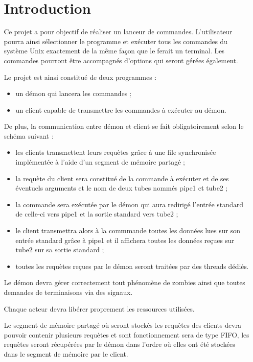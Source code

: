 \section*{Introduction} %

Ce projet a pour objectif de réaliser un lanceur de commandes.
L'utilisateur pourra ainsi sélectionner le programme et exécuter 
tous les commandes du système Unix exactement de la même façon 
que le ferait un terminal.
Les commandes pourront être accompagnés d'options qui seront gérées également.
\smallskip

Le projet est ainsi constitué de deux programmes :
\begin{itemize} %
\item un démon qui lancera les commandes ;
\item un client capable de transmettre les commandes à exécuter au démon.
\end{itemize}
\smallskip

De plus, la communication entre démon et client se fait 
obligatoirement selon le schéma suivant :
\begin{itemize}
 \item les clients transmettent leurs requètes 
       grâce à une file synchronisée implémentée 
       à l'aide d'un segment de mémoire partagé ;
 \item la requète du client sera constitué 
       de la commande à exécuter et de ses 
       éventuels arguments et le nom de deux 
       tubes nommés pipe1 et tube2 ;
 \item la commande sera exécutée par 
       le démon qui aura redirigé 
       l'entrée standard de celle-ci 
       vers pipe1 et 
       la sortie standard vers tube2 ;  
 \item le client transmettra alors à 
       la commmande toutes les données 
       lues sur son entrée standard 
       grâce à pipe1 et il affichera 
       toutes les données reçues sur tube2
       sur sa sortie standard ;
 \item toutes les requètes reçues par 
       le démon seront traitées par des threads dédiés.
\end{itemize}
\vspace{\parskip}

Le démon devra gérer correctement tout phénomène de zombies 
ainsi que toutes demandes de terminaisons via des signaux.

Chaque acteur devra libérer proprement les ressources utilisées.

Le segment de mémoire partagé où seront stockés 
les requètes des clients devra pouvoir contenir plusieurs requètes 
et sont fonctionnement sera de type FIFO, 
les requètes seront récupérées par le démon 
dans l'ordre où elles ont été stockées 
dans le segment de mémoire par le client.

